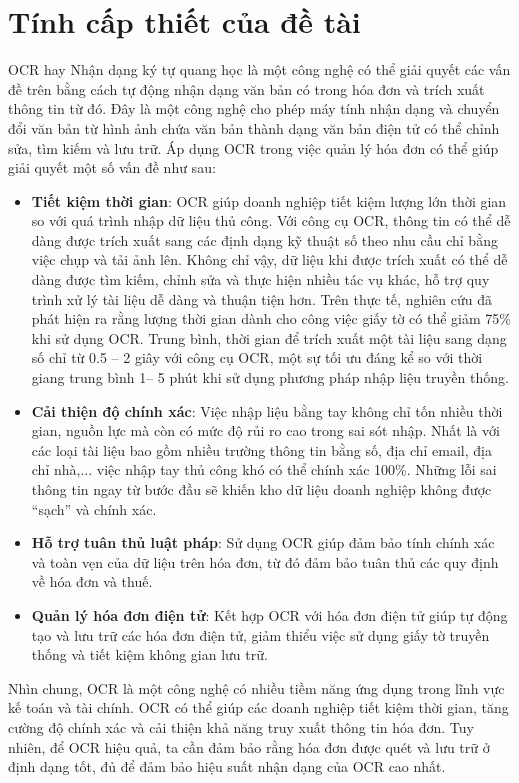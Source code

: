 \section{Tính cấp thiết của đề tài}
OCR hay Nhận dạng ký tự quang học là một công nghệ có thể giải quyết các vấn đề trên bằng cách tự động nhận dạng văn bản có trong hóa đơn và trích xuất thông tin từ đó. Đây là một công nghệ cho phép máy tính nhận dạng và chuyển đổi văn bản từ hình ảnh chứa văn bản thành dạng văn bản điện tử có thể chỉnh sửa, tìm kiếm và lưu trữ. Áp dụng OCR trong việc quản lý hóa đơn có thể giúp giải quyết một số vấn đề như sau:
\begin{itemize}
    \item \textbf{Tiết kiệm thời gian}: OCR giúp doanh nghiệp tiết kiệm lượng lớn thời gian so với quá trình nhập dữ liệu thủ công. Với công cụ OCR, thông tin có thể dễ dàng được trích xuất sang các định dạng kỹ thuật số theo nhu cầu chỉ bằng việc chụp và tải ảnh lên. Không chỉ vậy, dữ liệu khi được trích xuất có thể dễ dàng được tìm kiếm, chỉnh sửa và thực hiện nhiều tác vụ khác, hỗ trợ quy trình xử lý tài liệu dễ dàng và thuận tiện hơn. Trên thực tế, nghiên cứu đã phát hiện ra rằng lượng thời gian dành cho công việc giấy tờ có thể giảm 75\% khi sử dụng OCR. Trung bình, thời gian để trích xuất một tài liệu sang dạng số chỉ từ 0.5 – 2 giây với công cụ OCR, một sự tối ưu đáng kể so với thời giang trung bình 1– 5 phút khi sử dụng phương pháp nhập liệu truyền thống. \cite{fptai}
    \item \textbf{Cải thiện độ chính xác}: Việc nhập liệu bằng tay không chỉ tốn nhiều thời gian, nguồn lực mà còn có mức độ rủi ro cao trong sai sót nhập. Nhất là với các loại tài liệu bao gồm nhiều trường thông tin bằng số, địa chỉ email, địa chỉ nhà,... việc nhập tay thủ công khó có thể chính xác 100\%. Những lỗi sai thông tin ngay từ bước đầu sẽ khiến kho dữ liệu doanh nghiệp không được “sạch” và chính xác. 
    \item \textbf{Hỗ trợ tuân thủ luật pháp}: Sử dụng OCR giúp đảm bảo tính chính xác và toàn vẹn của dữ liệu trên hóa đơn, từ đó đảm bảo tuân thủ các quy định về hóa đơn và thuế.
    \item \textbf{Quản lý hóa đơn điện tử}: Kết hợp OCR với hóa đơn điện tử giúp tự động tạo và lưu trữ các hóa đơn điện tử, giảm thiểu việc sử dụng giấy tờ truyền thống và tiết kiệm không gian lưu trữ.
\end{itemize}

Nhìn chung, OCR là một công nghệ có nhiều tiềm năng ứng dụng trong lĩnh vực kế toán và tài chính. OCR có thể giúp các doanh nghiệp tiết kiệm thời gian, tăng cường độ chính xác và cải thiện khả năng truy xuất thông tin hóa đơn. Tuy nhiên, để OCR hiệu quả, ta cần đảm bảo rằng hóa đơn được quét và lưu trữ ở định dạng tốt, đủ để đảm bảo hiệu suất nhận dạng của OCR cao nhất. 

